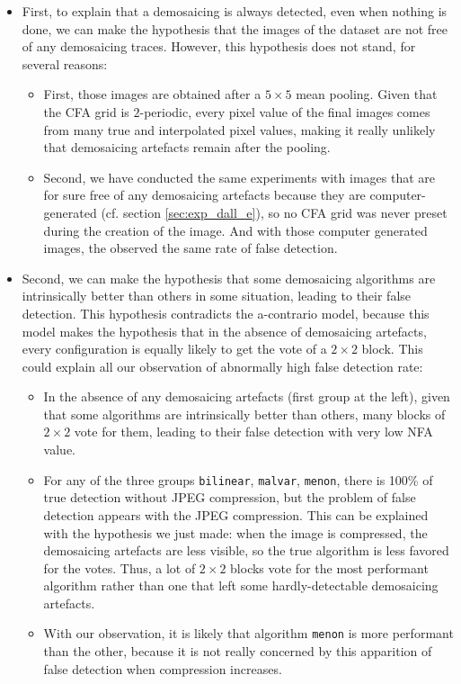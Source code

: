 \documentclass[sigconf, nonacm]{acmart}
\begin{document}
\begin{itemize}
    \item First, to explain that a demosaicing is always detected, even when nothing is done, we can make the hypothesis that the images of the dataset \cite{colom_noise_2023} are not free of any demosaicing traces. However, this hypothesis does not stand, for several reasons:
    \begin{itemize}
        \item First, those images are obtained after a $5 \times 5$ mean pooling. Given that the CFA grid is $2$-periodic, every pixel value of the final images comes from many true and interpolated pixel values, making it really unlikely that demosaicing artefacts remain after the pooling.
        \item Second, we have conducted the same experiments with images that are for sure free of any demosaicing artefacts because they are computer-generated (cf. section \ref{sec:exp_dall_e}), so no CFA grid was never preset during the creation of the image. And with those computer generated images, the observed the same rate of false detection.
    \end{itemize}
    \item Second, we can make the hypothesis that some demosaicing algorithms are intrinsically better than others in some situation, leading to their false detection. This hypothesis contradicts the a-contrario model, because this model makes the hypothesis that in the absence of demosaicing artefacts, every configuration is equally likely to get the vote of a $2 \times 2$ block. This could explain all our observation of abnormally high false detection rate:
    \begin{itemize}
        \item In the absence of any demosaicing artefacts (first group at the left), given that some algorithms are intrinsically better than others, many blocks of $2 \times 2$ vote for them, leading to their false detection with very low NFA value.
        \item For any of the three groups \texttt{bilinear}, \texttt{malvar}, \texttt{menon}, there is 100\% of true detection without JPEG compression, but the problem of false detection appears with the JPEG compression. This can be explained with the hypothesis we just made: when the image is compressed, the demosaicing artefacts are less visible, so the true algorithm is less favored for the votes. Thus, a lot of $2 \times 2$ blocks vote for the most performant algorithm rather than one that left some hardly-detectable demosaicing artefacts.
        \item With our observation, it is likely that algorithm \texttt{menon} is more performant than the other, because it is not really concerned by this apparition of false detection when compression increases.
    \end{itemize}
\end{itemize}
\end{document}
